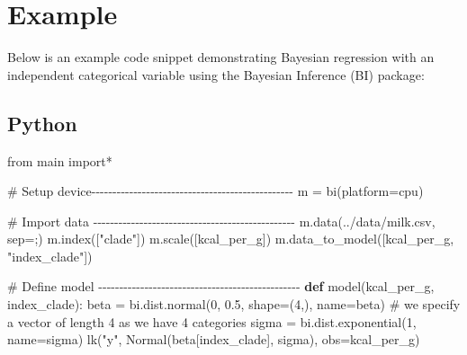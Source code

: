 \documentclass[
  letterpaper,
  DIV=11,
  numbers=noendperiod]{scrreprt}
\newenvironment{Shaded}{\begin{snugshade}}{\end{snugshade}}
\newcommand{\CommentTok}[1]{\textcolor[rgb]{0.37,0.37,0.37}{#1}}
\newcommand{\DecValTok}[1]{\textcolor[rgb]{0.68,0.00,0.00}{#1}}
\newcommand{\FloatTok}[1]{\textcolor[rgb]{0.68,0.00,0.00}{#1}}
\newcommand{\ImportTok}[1]{\textcolor[rgb]{0.00,0.46,0.62}{#1}}
\newcommand{\KeywordTok}[1]{\textcolor[rgb]{0.00,0.23,0.31}{\textbf{#1}}}
\newcommand{\NormalTok}[1]{\textcolor[rgb]{0.00,0.23,0.31}{#1}}
\newcommand{\OperatorTok}[1]{\textcolor[rgb]{0.37,0.37,0.37}{#1}}
\newcommand{\StringTok}[1]{\textcolor[rgb]{0.13,0.47,0.30}{#1}}
\begin{document}
\section{Example}\label{example-3}

Below is an example code snippet demonstrating Bayesian regression with
an independent categorical variable using the Bayesian Inference (BI)
package:

\subsection{Python}

\begin{Shaded}
\begin{Highlighting}[]
\ImportTok{from}\NormalTok{ main }\ImportTok{import}\OperatorTok{*}

\CommentTok{\# Setup device{-}{-}{-}{-}{-}{-}{-}{-}{-}{-}{-}{-}{-}{-}{-}{-}{-}{-}{-}{-}{-}{-}{-}{-}{-}{-}{-}{-}{-}{-}{-}{-}{-}{-}{-}{-}{-}{-}{-}{-}{-}{-}{-}{-}{-}{-}{-}{-}}
\NormalTok{m }\OperatorTok{=}\NormalTok{ bi(platform}\OperatorTok{=}\StringTok{\textquotesingle{}cpu\textquotesingle{}}\NormalTok{)}

\CommentTok{\# Import data {-}{-}{-}{-}{-}{-}{-}{-}{-}{-}{-}{-}{-}{-}{-}{-}{-}{-}{-}{-}{-}{-}{-}{-}{-}{-}{-}{-}{-}{-}{-}{-}{-}{-}{-}{-}{-}{-}{-}{-}{-}{-}{-}{-}{-}{-}{-}{-}}
\NormalTok{m.data(}\StringTok{\textquotesingle{}../data/milk.csv\textquotesingle{}}\NormalTok{, sep}\OperatorTok{=}\StringTok{\textquotesingle{};\textquotesingle{}}\NormalTok{) }
\NormalTok{m.index([}\StringTok{"clade"}\NormalTok{])}
\NormalTok{m.scale([}\StringTok{\textquotesingle{}kcal\_per\_g\textquotesingle{}}\NormalTok{])}
\NormalTok{m.data\_to\_model([}\StringTok{\textquotesingle{}kcal\_per\_g\textquotesingle{}}\NormalTok{, }\StringTok{"index\_clade"}\NormalTok{])}

\CommentTok{\# Define model {-}{-}{-}{-}{-}{-}{-}{-}{-}{-}{-}{-}{-}{-}{-}{-}{-}{-}{-}{-}{-}{-}{-}{-}{-}{-}{-}{-}{-}{-}{-}{-}{-}{-}{-}{-}{-}{-}{-}{-}{-}{-}{-}{-}{-}{-}{-}{-}}
\KeywordTok{def}\NormalTok{ model(kcal\_per\_g, index\_clade):    }
\NormalTok{    beta }\OperatorTok{=}\NormalTok{ bi.dist.normal(}\DecValTok{0}\NormalTok{, }\FloatTok{0.5}\NormalTok{, shape}\OperatorTok{=}\NormalTok{(}\DecValTok{4}\NormalTok{,), name}\OperatorTok{=}\StringTok{\textquotesingle{}beta\textquotesingle{}}\NormalTok{)  }\CommentTok{\# we specify a vector of length 4 as we have 4 categories}
\NormalTok{    sigma }\OperatorTok{=}\NormalTok{ bi.dist.exponential(}\DecValTok{1}\NormalTok{, name}\OperatorTok{=}\StringTok{\textquotesingle{}sigma\textquotesingle{}}\NormalTok{)}
\NormalTok{    lk(}\StringTok{"y"}\NormalTok{, Normal(beta[index\_clade], sigma), obs}\OperatorTok{=}\NormalTok{kcal\_per\_g)}



\end{Highlighting}
\end{Shaded}
\end{document}
